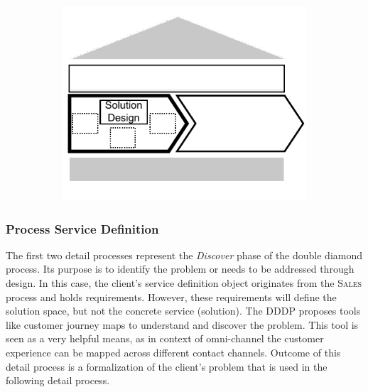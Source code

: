 	\begin{figure}[caption={\textsc{Solution Design} Process}, label={fig:soldes}]
		\begin{subfigure}[c]{.45\textwidth}
			\begin{center}
				\includegraphics{figures/processes/solutiondesign.pdf}
			\end{center}
		\end{subfigure}
		\begin{subfigure}[c]{.45\textwidth}
			\begin{center}
			\end{center}
		\end{subfigure}
		
	\end{figure}
	
	\subsubsection{Process Service Definition}
	The first two detail processes represent the \textit{Discover} phase of the double diamond process. Its purpose is to identify the problem or needs to be addressed through design. In this case, the client's service definition object originates from the \textsc{Sales} process and holds requirements. However, these requirements will define the solution space, but not the concrete service (solution). The \acrshort{DDDP} proposes tools like customer journey maps to understand and discover the problem. This tool is seen as a very helpful means, as in context of omni-channel the customer experience can be mapped across different contact channels. Outcome of this detail process is a formalization of the client's problem that is used in the following detail process. 
	
